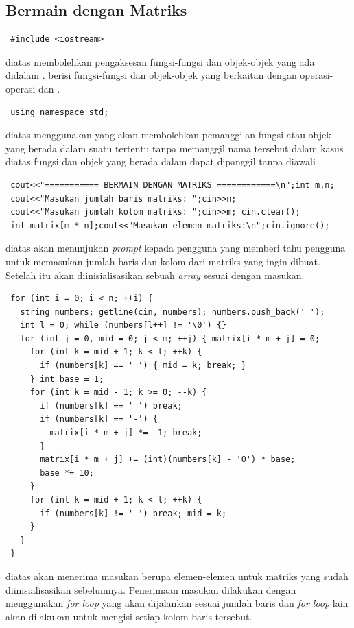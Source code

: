 \documentclass{subfiles}
\begin{document}
\subsection{Bermain dengan Matriks}
\begin{lstlisting}
 #include <iostream>
\end{lstlisting}
\ilz{}{\Script} diatas membolehkan pengaksesan fungsi-fungsi dan objek-objek yang ada didalam {\header} {\file} . {\Header} {\file}  berisi fungsi-fungsi dan objek-objek yang berkaitan dengan operasi-operasi {\ioi} dan {\ioo} {\stream}.

\begin{lstlisting}
 using namespace std;
\end{lstlisting}
\ilz{}{\Script} diatas menggunakan {\statement}  yang akan membolehkan pemanggilan fungsi atau objek yang berada dalam suatu  tertentu tanpa memanggil nama  tersebut dalam kasus diatas fungsi dan objek yang berada dalam  dapat dipanggil tanpa diawali .

\begin{lstlisting}
 cout<<"=========== BERMAIN DENGAN MATRIKS ============\n";int m,n; 
 cout<<"Masukan jumlah baris matriks: ";cin>>n;
 cout<<"Masukan jumlah kolom matriks: ";cin>>m; cin.clear();
 int matrix[m * n];cout<<"Masukan elemen matriks:\n";cin.ignore();
\end{lstlisting}
\ilz{}{\Script} diatas akan menunjukan \textit{prompt} kepada pengguna yang memberi tahu pengguna untuk memasukan jumlah baris dan kolom dari matriks yang ingin dibuat. Setelah itu akan diinisialisasikan sebuah \textit{array} sesuai dengan masukan.

\begin{lstlisting}
 for (int i = 0; i < n; ++i) {
   string numbers; getline(cin, numbers); numbers.push_back(' ');
   int l = 0; while (numbers[l++] != '\0') {}
   for (int j = 0, mid = 0; j < m; ++j) { matrix[i * m + j] = 0;
     for (int k = mid + 1; k < l; ++k) {
       if (numbers[k] == ' ') { mid = k; break; }
     } int base = 1;
     for (int k = mid - 1; k >= 0; --k) {
       if (numbers[k] == ' ') break;
       if (numbers[k] == '-') {
         matrix[i * m + j] *= -1; break;
       }
       matrix[i * m + j] += (int)(numbers[k] - '0') * base;
       base *= 10;
     }
     for (int k = mid + 1; k < l; ++k) { 
       if (numbers[k] != ' ') break; mid = k;
     }
   }
 }
\end{lstlisting}
\ilz{}{\Script} diatas akan menerima masukan berupa elemen-elemen untuk matriks yang sudah diinisialisasikan sebelumnya. Penerimaan masukan dilakukan dengan menggunakan \textit{for loop} yang akan dijalankan sesuai jumlah baris dan \textit{for loop} lain akan dilakukan untuk mengisi setiap kolom baris tersebut.
\end{document}
